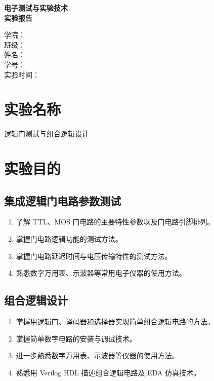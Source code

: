 \documentclass[a4paper,12pt]{article}
\begin{document}
\begin{titlepage}
    \centering
    \vfill
    {\bfseries 电子测试与实验技术\\[0.6em]实验报告\par}
    \vfill
    \vfill

    \begin{minipage}{0.72\textwidth}
        学\quad\quad 院：\underline{}\\[1.6em]
        班\quad\quad 级：\underline{}\\[1.6em]
        姓\quad\quad 名：\underline{}\\[1.6em]
        学\quad\quad 号：\underline{}\\[1.6em]
        实验时间：\underline{}
    \end{minipage}

    \vfill
    \vfill
\end{titlepage}

\setcounter{page}{1}

\section{实验名称}
逻辑门测试与组合逻辑设计


\section{实验目的}
\subsection{集成逻辑门电路参数测试}
\begin{enumerate}
    \item 了解 TTL、MOS 门电路的主要特性参数以及门电路引脚排列。
    \item 掌握门电路逻辑功能的测试方法。
    \item 掌握门电路延迟时间与电压传输特性的测试方法。
    \item 熟悉数字万用表、示波器等常用电子仪器的使用方法。
\end{enumerate}

\subsection{组合逻辑设计 }
\begin{enumerate}
    \item 掌握用逻辑门、译码器和选择器实现简单组合逻辑电路的方法。
    \item 掌握简单数字电路的安装与调试技术。
    \item 进一步熟悉数字万用表、示波器等仪器的使用方法。
    \item 熟悉用 Verilog HDL 描述组合逻辑电路及 EDA 仿真技术。
\end{enumerate}
\end{document}
